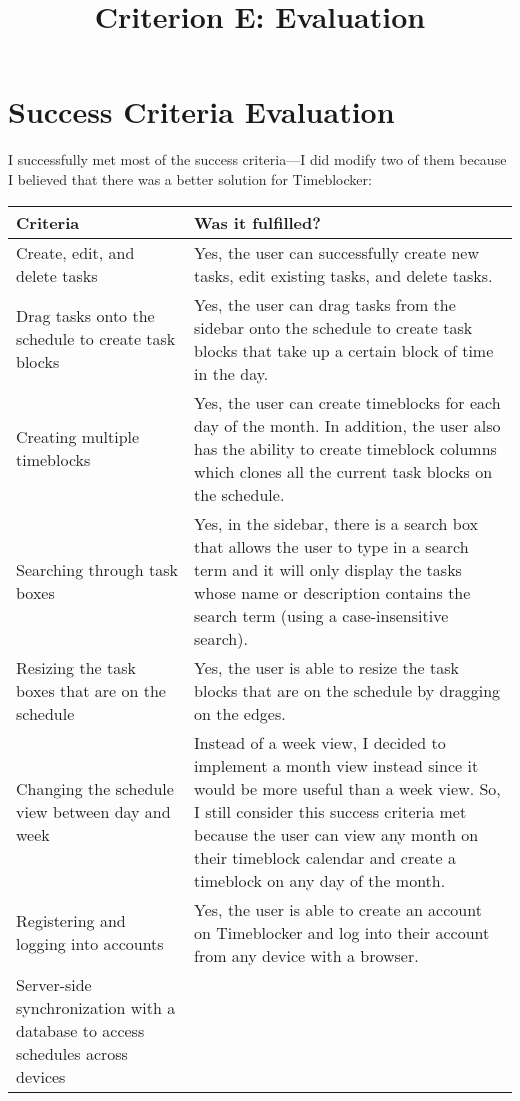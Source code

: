 \documentclass[12pt]{report}
\title{Criterion E: Evaluation}
\begin{document}
\centerline{\textcolor{msblue}{
		\textbf{\fontsize{13}{13}\MyTitle}
	}}

\section*{Success Criteria Evaluation}

I successfully met most of the success criteria—I did modify two of them because I believed that there was a better solution for Timeblocker:

\def\arraystretch{1.5}
\begin{xltabular}{\textwidth}{|X|X|}
	\hline
	\textbf{Criteria}
	&
	\textbf{Was it fulfilled?}
	\\\hline
	Create, edit, and delete tasks
	&
	Yes, the user can successfully create new tasks, edit existing tasks, and delete tasks.
	\\\hline
	Drag tasks onto the schedule to create task blocks
	&
	Yes, the user can drag tasks from the sidebar onto the schedule to create task blocks that take up a certain block of time in the day.
	\\\hline
	Creating multiple timeblocks
	&
	Yes, the user can create timeblocks for each day of the month. In addition, the user also has the ability to create timeblock columns which clones all the current task blocks on the schedule.
	\\\hline
	Searching through task boxes
	&
	Yes, in the sidebar, there is a search box that allows the user to type in a search term and it will only display the tasks whose name or description contains the search term (using a case-insensitive search).
	\\\hline
	Resizing the task boxes that are on the schedule
	&
	Yes, the user is able to resize the task blocks that are on the schedule by dragging on the edges.
	\\\hline
	Changing the schedule view between day and week
	&
	Instead of a week view, I decided to implement a month view instead since it would be more useful than a week view. So, I still consider this success criteria met because the user can view any month on their timeblock calendar and create a timeblock on any day of the month.
	\\\hline
	Registering and logging into accounts
	&
	Yes, the user is able to create an account on Timeblocker and log into their account from any device with a browser.
	\\\hline
	Server-side synchronization with a database to access schedules across devices

\end{xltabular}
\end{document}
